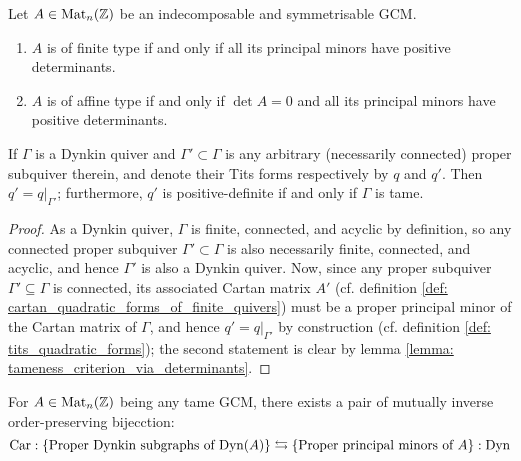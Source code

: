            \begin{lemma} \label{lemma: tameness_criterion_via_determinants}
                \cite[Theorem 15.18]{carter_affine_lie_algebras} Let $A \in \mathrm{Mat}_n(\mathbb{Z})$ be an indecomposable and symmetrisable GCM. 
                    \begin{enumerate}
                        \item $A$ is of finite type if and only if all its principal minors have positive determinants.
                        \item $A$ is of affine type if and only if $\det A = 0$ and all its principal minors have positive determinants.
                    \end{enumerate}
            \end{lemma}
            \begin{proposition} \label{prop: tits_forms_of_connected_proper_subquivers_of_tame_dynkin_quivers}
                If $\Gamma$ is a Dynkin quiver and $\Gamma' \subset \Gamma$ is any arbitrary (necessarily connected) proper subquiver therein, and denote their Tits forms respectively by $q$ and $q'$. Then $q' = q|_{\Gamma'}$; furthermore, $q'$ is positive-definite if and only if $\Gamma$ is tame. 
            \end{proposition}
                \begin{proof}
                    As a Dynkin quiver, $\Gamma$ is finite, connected, and acyclic by definition, so any connected proper subquiver $\Gamma' \subset \Gamma$ is also necessarily finite, connected, and acyclic, and hence $\Gamma'$ is also a Dynkin quiver. Now, since any proper subquiver $\Gamma' \subseteq \Gamma$ is connected, its associated Cartan matrix $A'$ (cf. definition \ref{def: cartan_quadratic_forms_of_finite_quivers}) must be a proper principal minor of the Cartan matrix of $\Gamma$, and hence $q' = q|_{\Gamma'}$ by construction (cf. definition \ref{def: tits_quadratic_forms}); the second statement is clear by lemma \ref{lemma: tameness_criterion_via_determinants}.
                \end{proof}
            \begin{corollary} \label{coro: dynkin_quivers_of_symmetrisable_indecomposable_generalised_cartan_matrices}
                \cite[Proposition 4.7]{kac_infinite_dimensional_lie_algebras} For $A \in \mathrm{Mat}_n(\mathbb{Z})$ being any tame GCM, there exists a pair of mutually inverse order-preserving bijecction:
                    $$\mathrm{Car}: \{ \text{Proper Dynkin subgraphs of $\mathrm{Dyn}(A)$} \} \leftrightarrows \{ \text{Proper principal minors of $A$} \}: \mathrm{Dyn}$$
            \end{corollary}
            
